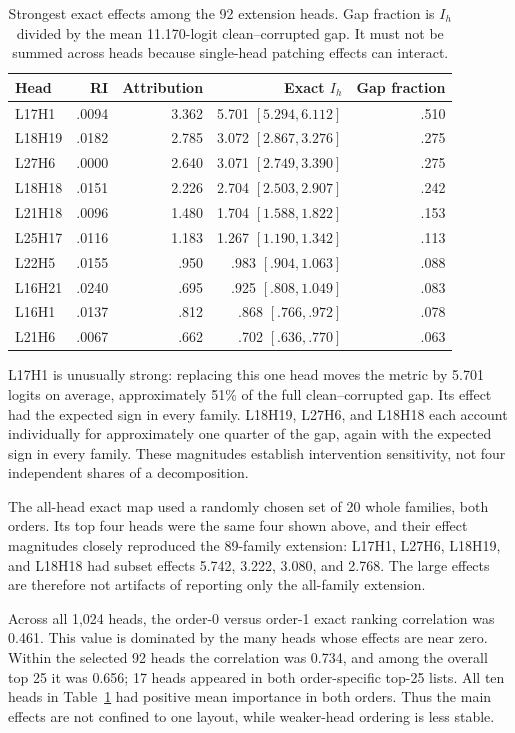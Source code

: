 \documentclass[11pt,a4paper]{article}
\begin{document}
\begin{table}[ht]
\centering
\small
\begin{tabular}{lrrrr}
\toprule
Head & RI & Attribution & Exact $I_h$ & Gap fraction \\
\midrule
L17H1  & .0094 & 3.362 & 5.701 $[5.294,6.112]$ & .510 \\
L18H19 & .0182 & 2.785 & 3.072 $[2.867,3.276]$ & .275 \\
L27H6  & .0000 & 2.640 & 3.071 $[2.749,3.390]$ & .275 \\
L18H18 & .0151 & 2.226 & 2.704 $[2.503,2.907]$ & .242 \\
L21H18 & .0096 & 1.480 & 1.704 $[1.588,1.822]$ & .153 \\
L25H17 & .0116 & 1.183 & 1.267 $[1.190,1.342]$ & .113 \\
L22H5  & .0155 & .950 & .983 $[.904,1.063]$ & .088 \\
L16H21 & .0240 & .695 & .925 $[.808,1.049]$ & .083 \\
L16H1  & .0137 & .812 & .868 $[.766,.972]$ & .078 \\
L21H6  & .0067 & .662 & .702 $[.636,.770]$ & .063 \\
\bottomrule
\end{tabular}
\caption{Strongest exact effects among the 92 extension heads. Gap fraction is
$I_h$ divided by the mean 11.170-logit clean--corrupted gap. It must not be
summed across heads because single-head patching effects can interact.}
\label{tab:top}
\end{table}

L17H1 is unusually strong: replacing this one head moves the metric by 5.701
logits on average, approximately 51\% of the full clean--corrupted gap. Its
effect had the expected sign in every family. L18H19, L27H6, and L18H18 each
account individually for approximately one quarter of the gap, again with the
expected sign in every family. These magnitudes establish intervention
sensitivity, not four independent shares of a decomposition.

The all-head exact map used a randomly chosen set of 20 whole families, both
orders. Its top four heads were the same four shown above, and their effect
magnitudes closely reproduced the 89-family extension: L17H1, L27H6, L18H19,
and L18H18 had subset effects 5.742, 3.222, 3.080, and 2.768. The large effects
are therefore not artifacts of reporting only the all-family extension.

Across all 1,024 heads, the order-0 versus order-1 exact ranking correlation was
0.461. This value is dominated by the many heads whose effects are near zero.
Within the selected 92 heads the correlation was 0.734, and among the overall
top 25 it was 0.656; 17 heads appeared in both order-specific top-25 lists. All
ten heads in Table~\ref{tab:top} had positive mean importance in both orders.
Thus the main effects are not confined to one layout, while weaker-head ordering
is less stable.
\end{document}
